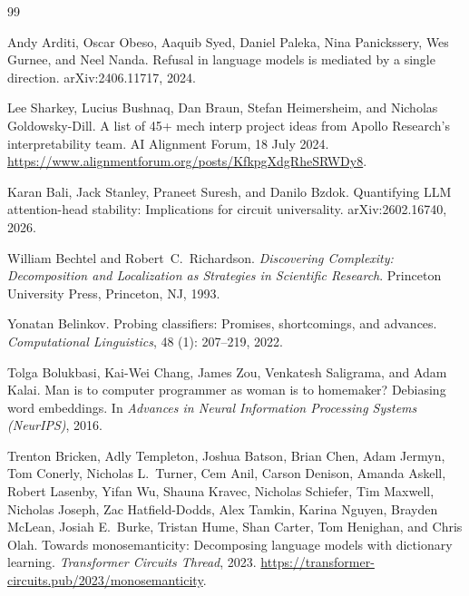 \documentclass{article}
\begin{document}
\begin{thebibliography}{99}

Andy Arditi, Oscar Obeso, Aaquib Syed, Daniel Paleka, Nina Panickssery, Wes Gurnee,
  and Neel Nanda.
\newblock Refusal in language models is mediated by a single direction.
\newblock arXiv:2406.11717, 2024.

Lee Sharkey, Lucius Bushnaq, Dan Braun, Stefan Heimersheim, and Nicholas
  Goldowsky-Dill.
\newblock A list of 45+ mech interp project ideas from {A}pollo {R}esearch's
  interpretability team.
\newblock AI Alignment Forum, 18 July 2024.
  \url{https://www.alignmentforum.org/posts/KfkpgXdgRheSRWDy8}.

Karan Bali, Jack Stanley, Praneet Suresh, and Danilo Bzdok.
\newblock Quantifying {LLM} attention-head stability: Implications for circuit
  universality.
\newblock arXiv:2602.16740, 2026.

William Bechtel and Robert~C.\ Richardson.
\newblock \emph{Discovering Complexity: Decomposition and Localization as
  Strategies in Scientific Research}.
\newblock Princeton University Press, Princeton, NJ, 1993.

Yonatan Belinkov.
\newblock Probing classifiers: Promises, shortcomings, and advances.
\newblock \emph{Computational Linguistics}, 48 (1): 207--219, 2022.

Tolga Bolukbasi, Kai-Wei Chang, James Zou, Venkatesh Saligrama, and Adam Kalai.
\newblock Man is to computer programmer as woman is to homemaker? Debiasing word
  embeddings.
\newblock In \emph{Advances in Neural Information Processing Systems (NeurIPS)}, 2016.

Trenton Bricken, Adly Templeton, Joshua Batson, Brian Chen, Adam Jermyn,
  Tom Conerly, Nicholas L.\ Turner, Cem Anil, Carson Denison, Amanda Askell,
  Robert Lasenby, Yifan Wu, Shauna Kravec, Nicholas Schiefer, Tim Maxwell,
  Nicholas Joseph, Zac Hatfield-Dodds, Alex Tamkin, Karina Nguyen, Brayden
  McLean, Josiah E.\ Burke, Tristan Hume, Shan Carter, Tom Henighan, and
  Chris Olah.
\newblock Towards monosemanticity: Decomposing language models with dictionary
  learning.
\newblock \emph{Transformer Circuits Thread}, 2023.
\newblock \url{https://transformer-circuits.pub/2023/monosemanticity}.


\end{thebibliography}
\end{document}

